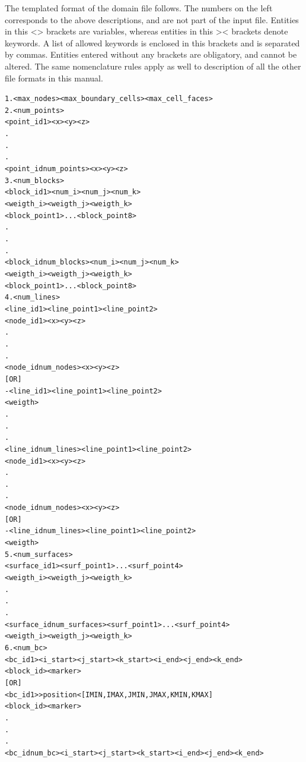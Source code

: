 \documentclass[10pt]{article}
\newcommand*{\tc}{\ttfamily} %
\begin{document}
    The templated format of the domain file follows. The numbers on
    the left corresponds to the above descriptions, and are not part
    of the input file. Entities in this {\tc <>} brackets are variables,
    whereas entities in this {\tc ><} brackets denote keywords. A
    list of allowed keywords is enclosed in this {\tc[,,]} brackets
    and is separated by commas. Entities entered without any brackets
    are obligatory, and cannot be altered. The same nomenclature
    rules apply as well to description of all the other file formats
    in this manual. 
    \small
    \begin{alltt}
    1. <max_nodes>  <max_boundary_cells>  <max_cell_faces> 
    2. <num_points> 
            <point_id 1>  <x>  <y>  <z>
               . 
               .
               .
            <point_id num_points>  <x>  <y>  <z>
    3. <num_blocks> 
            <block_id 1>   <num_i>  <num_j>  <num_k>    
               <weigth_i>  <weigth_j>  <weigth_k> 
               <block_point 1> ... <block_point 8>
               .
               .
               .
            <block_id num_blocks>   <num_i>  <num_j>  <num_k>    
               <weigth_i>  <weigth_j>  <weigth_k> 
               <block_point 1> ... <block_point 8>
    4. <num_lines>  
            <line_id 1>  <line_point 1>  <line_point 2> 
               <node_id 1>  <x>  <y>  <z>
               .
               .
               .
               <node_id num_nodes>  <x>  <y>  <z>
             [OR]
           -<line_id 1>  <line_point 1>  <line_point 2> 
               <weigth> 
               . 
               .
               .
            <line_id num_lines>  <line_point 1>  <line_point 2> 
               <node_id 1>  <x>  <y>  <z>
               .
               .
               .
               <node_id num_nodes>  <x>  <y>  <z>
             [OR]
           -<line_id num_lines>  <line_point 1>  <line_point 2> 
               <weigth> 
    5. <num_surfaces> 
            <surface_id 1>  <surf_point 1> ... <surf_point 4>
               <weigth_i>  <weigth_j>  <weigth_k> 
               .
               .
               . 
            <surface_id num_surfaces>  <surf_point 1> ... <surf_point 4>
               <weigth_i>  <weigth_j>  <weigth_k> 
    6. <num_bc> 
            <bc_id 1> <i_start> <j_start> <k_start> <i_end> <j_end> <k_end>
               <block_id>  <marker>
            [OR]  
            <bc_id 1>  >position<  [IMIN,IMAX,JMIN,JMAX,KMIN,KMAX]  
               <block_id>  <marker>
               .
               .
               . 
            <bc_id num_bc> <i_start> <j_start> <k_start> <i_end> <j_end> <k_end>

\end{alltt}
\end{document}
